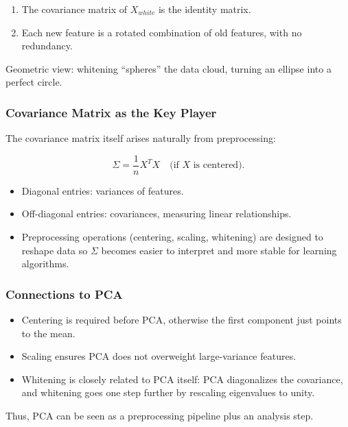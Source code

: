 \documentclass[
  letterpaper,
  DIV=11,
  numbers=noendperiod]{scrreprt}
\providecommand{\tightlist}{%
  \setlength{\itemsep}{0pt}\setlength{\parskip}{0pt}}
\begin{document}
\begin{enumerate}
\def\labelenumi{\arabic{enumi}.}
\tightlist
\item
  The covariance matrix of \(X_{white}\) is the identity matrix.
\item
  Each new feature is a rotated combination of old features, with no
  redundancy.
\end{enumerate}

Geometric view: whitening ``spheres'' the data cloud, turning an ellipse
into a perfect circle.

\subsubsection{Covariance Matrix as the Key
Player}\label{covariance-matrix-as-the-key-player}

The covariance matrix itself arises naturally from preprocessing:

\[
\Sigma = \frac{1}{n} X^T X \quad \text{(if \(X\) is centered).}
\]

\begin{itemize}
\tightlist
\item
  Diagonal entries: variances of features.
\item
  Off-diagonal entries: covariances, measuring linear relationships.
\item
  Preprocessing operations (centering, scaling, whitening) are designed
  to reshape data so \(\Sigma\) becomes easier to interpret and more
  stable for learning algorithms.
\end{itemize}

\subsubsection{Connections to PCA}\label{connections-to-pca}

\begin{itemize}
\tightlist
\item
  Centering is required before PCA, otherwise the first component just
  points to the mean.
\item
  Scaling ensures PCA does not overweight large-variance features.
\item
  Whitening is closely related to PCA itself: PCA diagonalizes the
  covariance, and whitening goes one step further by rescaling
  eigenvalues to unity.
\end{itemize}

Thus, PCA can be seen as a preprocessing pipeline plus an analysis step.
\end{document}
